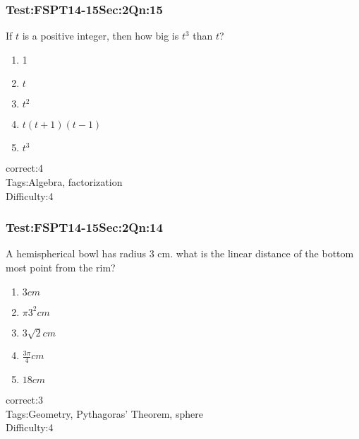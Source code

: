 \documentclass[]{beamer}
\begin{document}
    \begin{frame}
	    \frametitle{Test:FSPT14-15\hspace{2mm}Sec:2\hspace{2mm}Qn:15}
	If $t$ is a positive integer, then how big is $t^3$ than $t$?       
	    \begin{enumerate}
	        \item
	            1 	
	        \item
	            $t$
	        \item
	            $t^2$
	        \item
	            $t(t+1)(t-1)$
	        \item
	            $t^3$
	    \end{enumerate}
	    correct:4  \\   
	    Tags:Algebra, factorization    \\
	    Difficulty:4   \\
    \end{frame}
    \begin{frame}
	    \frametitle{Test:FSPT14-15\hspace{2mm}Sec:2\hspace{2mm}Qn:14}
	     A hemispherical bowl has radius 3 cm. what is the linear distance of the bottom most point from the rim?  
	    \begin{enumerate}
	        \item
	            $3 cm$	
	        \item
	            $\pi 3^2 cm$
	        \item
	            $3\sqrt{2} cm$
	        \item
	            $ \frac{3\pi}{4} cm$
	        \item
	            $ 18 cm$
	    \end{enumerate}
	    correct:3  \\   
	    Tags:Geometry, Pythagoras' Theorem, sphere    \\
	    Difficulty:4   \\
    \end{frame}
\end{document}
